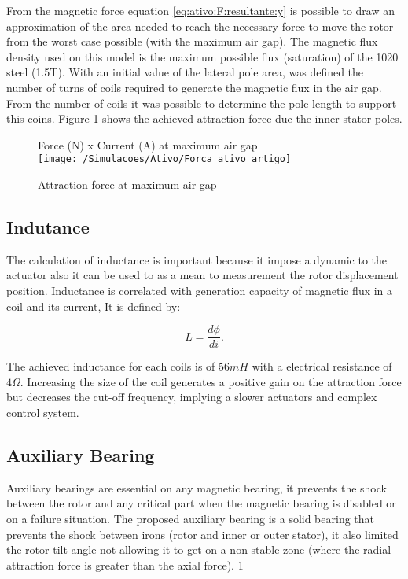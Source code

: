 \documentclass[10pt,fleqn,a4paper,twoside]{article}
\begin{document}
	From the magnetic force equation \eqref{eq:ativo:F:resultante:y} is possible to draw an approximation of the area needed to reach the necessary force to move the rotor from the worst case possible (with the maximum air gap). The magnetic flux density used on this model is the maximum possible flux (saturation) of the 1020 steel (1.5T). With an initial value of the lateral pole area, was defined the number of turns of coils required to generate the magnetic flux in the air gap. From the number of coils it was possible to determine the pole length to support this coins. Figure \ref{fig:magnetico:ativo:comsol} shows the achieved attraction force due the inner stator poles.
	
	\begin{figure}
		\centering
		Force (N) x Current (A) at maximum air gap\\
		\texttt{[image: /Simulacoes/Ativo/Forca\_ativo\_artigo]}
		\caption{Attraction force at maximum air gap }
		\label{fig:magnetico:ativo:comsol}
	\end{figure}
	
	\subsection{Indutance} \label{subsec:at:indutancia}
	
	The calculation of inductance is important because it impose a dynamic to the actuator also it can be used to as a mean to measurement the rotor displacement position. Inductance is correlated with generation capacity of magnetic flux in a coil and its current, It is defined by:
	
	\begin{equation}
		L = \frac{d \phi}{di} .
	\end{equation}
	
	The achieved inductance for each coils is of $56 mH$ with a electrical resistance of $4 \Omega$. Increasing the size of the coil generates a positive gain on the attraction force but decreases the cut-off frequency, implying a slower actuators and complex control system.
	
	\subsection{Auxiliary Bearing}
	
	Auxiliary bearings are essential on any magnetic bearing, it prevents the shock between the rotor and any critical part when the magnetic bearing is disabled or on a failure situation. The proposed auxiliary bearing is a solid bearing that prevents the shock between irons (rotor and inner or outer stator), it also limited the rotor tilt angle not allowing it to get on a non stable zone (where the radial attraction force is greater than the axial force).
	1	
\end{document}
